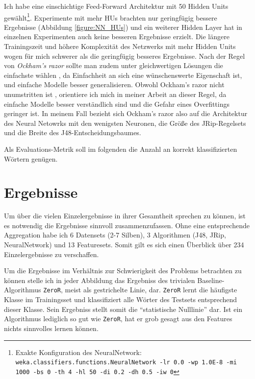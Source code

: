 Ich habe eine einschichtige Feed-Forward Architektur mit 50 Hidden Units gewählt\footnote{\label{nn_conf}Exakte Konfiguration des NeuralNetwork: \texttt{weka.classifiers.functions.NeuralNetwork -lr 0.0 -wp 1.0E-8 -mi 1000 -bs 0 -th 4 -hl 50 -di 0.2 -dh 0.5 -iw 0}}. Experimente mit mehr HUs brachten nur geringfügig bessere Ergebnisse (Abbildung \ref{figure:NN_HUs}) und ein weiterer Hidden Layer hat in einzelnen Experimenten auch keine besseren Ergebnisse erzielt. Die längere Trainingszeit und höhere Komplexität des Netzwerks mit mehr Hidden Units wogen für mich schwerer als die geringfügig besseres Ergebnisse. Nach der Regel von \textit{Ockham's razor} sollte man zudem unter gleichwertigen Lösungen die einfachste wählen \cite[S.~652]{RusselNorvig2013}, da Einfachheit an sich eine wünschenswerte Eigenschaft ist, und einfache Modelle besser generalisieren. Obwohl Ockham's razor nicht unumstritten ist \cite{Domingos}, orientiere ich mich in meiner Arbeit an dieser Regel, da einfache Modelle besser verständlich sind und die Gefahr eines Overfittings geringer ist\cite[S.~6]{Domingos}. In meinem Fall bezieht sich Ockham's razor also auf die Architektur des Neural Netowrks mit den wenigsten Neuronen, die Größe des JRip-Regelsets und die Breite des J48-Entscheidungsbaumes.

Als Evaluations-Metrik soll im folgenden die Anzahl an korrekt klassifizierten Wörtern genügen.

\section{Ergebnisse}

Um über die vielen Einzelergebnisse in ihrer Gesamtheit sprechen zu können, ist es notwendig die Ergebnisse sinnvoll zusammenzufassen. Ohne eine entsprechende Aggregation habe ich 6 Datensets (2-7 Silben), 3 Algorithmen (J48, JRip, NeuralNetwork) und 13 Featuresets. Somit gilt es sich einen Überblick über 234 Einzelergebnisse zu verschaffen.

Um die Ergebnisse im Verhältnis zur Schwierigkeit des Problems betrachten zu können stelle ich in jeder Abbildung das Ergebniss des trivialen Baseline-Algorithmus \texttt{ZeroR}, meist als gestrichelte Linie, dar. \texttt{ZeroR} lernt die häufigste Klasse im Trainingsset und klassifiziert alle Wörter des Testsets entsprechend dieser Klasse. Sein Ergebniss stellt somit die \enquote{statistische Nulllinie} dar. Ist ein Algorithmus lediglich so gut wie \texttt{ZeroR}, hat er grob gesagt aus den Features nichts sinnvolles lernen können.


